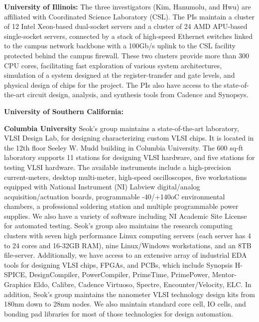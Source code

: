 \noindent
\textbf{University of Illinois:}
The three investigators (Kim, Hanumolu, and Hwu) are affiliated with Coordinated Science Laboratory (CSL). 
The PIs maintain a cluster of 12 Intel Xeon-based dual-socket servers and a cluster of 24 AMD APU-based single-socket servers, connected by a stack of high-speed Ethernet switches linked to the campus network backbone with a 100Gb/s uplink to the CSL facility protected behind the campus firewall.
These two clusters provide more than 300 CPU cores, facilitating fast exploration of various system architectures, simulation of a system designed at the register-transfer and gate levels, and physical design of chips for the project.
The PIs also have access to the state-of-the-art circuit design, analysis, and synthesis tools from Cadence and Synopsys.

\noindent
\textbf{University of Southern California:}

\noindent
\textbf{Columbia University}
Seok’s group maintains a state-of-the-art laboratory, VLSI Design Lab, for designing characterizing custom VLSI chips. It is located in the 12th floor Seeley W. Mudd building in Columbia University. The 600 sq-ft laboratory supports 11 stations for designing VLSI hardware, and five stations for testing VLSI hardware. The available instruments include a high-precision current-meters, desktop multi-meter, high-speed oscilloscopes, five workstations equipped with National Instrument (NI) Labview digital/analog acquisition/actuation boards, programmable -40/+140oC environmental chambers, a professional soldering station and multiple programmable power supplies. We also have a variety of software including NI Academic Site License for automated testing. 
Seok’s group also maintains the research computing clusters with seven high performance Linux computing servers (each server has 4 to 24 cores and 16-32GB RAM), nine Linux/Windows workstations, and an 8TB file-server. Additionally, we have access to an extensive array of industrial EDA tools for designing VLSI chips, FPGAs, and PCBs, which include Synopsis H-SPICE, DesignCompiler, PowerCompiler, PrimeTime, PrimePower, Mentor-Graphics Eldo, Calibre, Cadence Virtuoso, Spectre, Encounter/Velocity, ELC. In addition, Seok’s group maintains the nanometer VLSI technology design kits from 180nm down to 28nm nodes. We also maintain standard core cell, IO cells, and bonding pad libraries for most of those technologies for design automation. 

